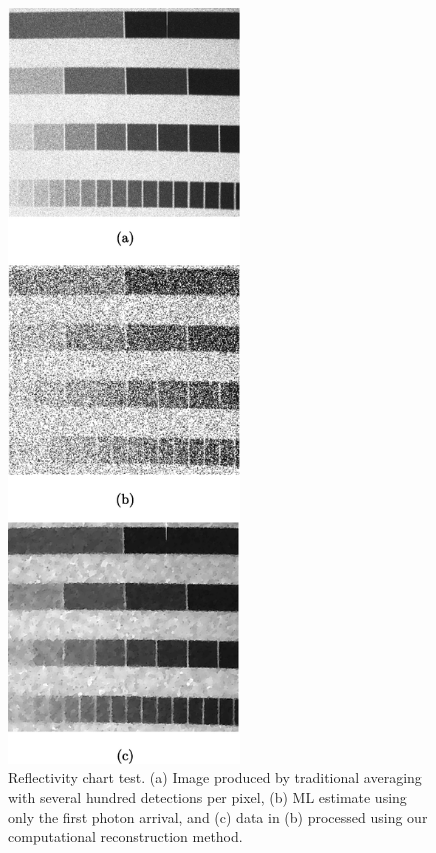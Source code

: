 \begin{figure}[h!]
\centerline{\includegraphics[height=20cm]{figure-first-intensitychart.pdf}}
\caption{Reflectivity chart test. (a) Image produced by traditional averaging with several hundred detections per pixel, (b) ML estimate using only the first photon arrival, and (c) data in (b) processed using our computational reconstruction method.}
\label{figure:first-intensitychart}
\end{figure}

